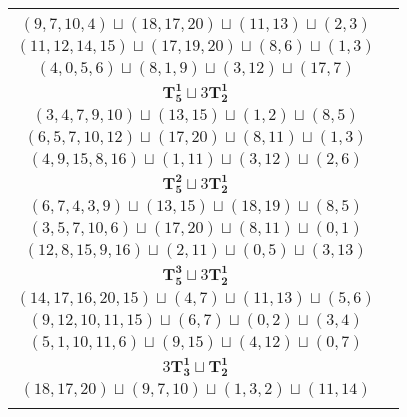 \documentclass{article}
\begin{document}
\begin{longtable}{|c|c|}
\begin{tabular}{c}
        $(11,9,12,6)\sqcup(0,1,2)\sqcup(18,15)\sqcup(13,14)$ \\ 
        $(9,7,10,4)\sqcup(18,17,20)\sqcup(11,13)\sqcup(2,3)$ \\ 
        $(11,12,14,15)\sqcup(17,19,20)\sqcup(8,6)\sqcup(1,3)$ \\ 
        $(4,0,5,6)\sqcup(8,1,9)\sqcup(3,12)\sqcup(17,7)$
        \end{tabular} \\ 
        \hline
        $\mathbf{T_{5}^{1}} \sqcup 3\mathbf{T_{2}^{1}}$ & \begin{tabular}{c}
        $(2,4,6,9,12)\sqcup(13,14)\sqcup(18,19)\sqcup(0,1)$ \\ 
        $(3,4,7,9,10)\sqcup(13,15)\sqcup(1,2)\sqcup(8,5)$ \\ 
        $(6,5,7,10,12)\sqcup(17,20)\sqcup(8,11)\sqcup(1,3)$ \\ 
        $(4,9,15,8,16)\sqcup(1,11)\sqcup(3,12)\sqcup(2,6)$
        \end{tabular} \\ 
        \hline
        $\mathbf{T_{5}^{2}} \sqcup 3\mathbf{T_{2}^{1}}$ & \begin{tabular}{c}
        $(11,9,6,4,12)\sqcup(16,15)\sqcup(8,10)\sqcup(2,3)$ \\ 
        $(6,7,4,3,9)\sqcup(13,15)\sqcup(18,19)\sqcup(8,5)$ \\ 
        $(3,5,7,10,6)\sqcup(17,20)\sqcup(8,11)\sqcup(0,1)$ \\ 
        $(12,8,15,9,16)\sqcup(2,11)\sqcup(0,5)\sqcup(3,13)$
        \end{tabular} \\ 
        \hline
        $\mathbf{T_{5}^{3}} \sqcup 3\mathbf{T_{2}^{1}}$ & \begin{tabular}{c}
        $(13,15,16,18,14)\sqcup(9,6)\sqcup(2,4)\sqcup(5,7)$ \\ 
        $(14,17,16,20,15)\sqcup(4,7)\sqcup(11,13)\sqcup(5,6)$ \\ 
        $(9,12,10,11,15)\sqcup(6,7)\sqcup(0,2)\sqcup(3,4)$ \\ 
        $(5,1,10,11,6)\sqcup(9,15)\sqcup(4,12)\sqcup(0,7)$
        \end{tabular} \\ 
        \hline
        $3\mathbf{T_{3}^{1}} \sqcup \mathbf{T_{2}^{1}}$ & \begin{tabular}{c}
        $(18,15,13)\sqcup(11,9,6)\sqcup(0,1,2)\sqcup(16,19)$ \\ 
        $(18,17,20)\sqcup(9,7,10)\sqcup(1,3,2)\sqcup(11,14)$ \\ 

\end{tabular}
\end{longtable}
\end{document}
